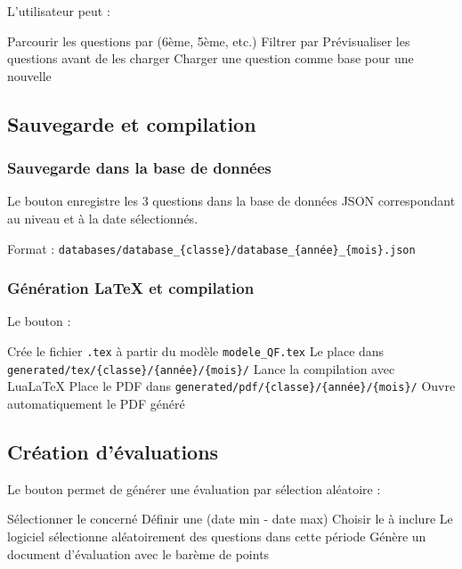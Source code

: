 L'utilisateur peut :
\begin{tcbenumerate}
    \tcbitem Parcourir les questions par  (6ème, 5ème, etc.)
    \tcbitem Filtrer par 
    \tcbitem Prévisualiser les questions avant de les charger
    \tcbitem Charger une question comme base pour une nouvelle
\end{tcbenumerate}

\subsection{Sauvegarde et compilation}

\subsubsection{Sauvegarde dans la base de données}

Le bouton  enregistre les 3 questions dans la base de données JSON correspondant au niveau et à la date sélectionnés.

Format : \texttt{databases/database\_\{classe\}/database\_\{année\}\_\{mois\}.json}

\subsubsection{Génération LaTeX et compilation}

Le bouton  :
\begin{tcbenumerate}
    \tcbitem Crée le fichier \texttt{.tex} à partir du modèle \texttt{modele\_QF.tex}
    \tcbitem Le place dans \texttt{generated/tex/\{classe\}/\{année\}/\{mois\}/}
    \tcbitem Lance la compilation avec LuaLaTeX
    \tcbitem Place le PDF dans \texttt{generated/pdf/\{classe\}/\{année\}/\{mois\}/}
    \tcbitem Ouvre automatiquement le PDF généré
\end{tcbenumerate}

\subsection{Création d'évaluations}

Le bouton  permet de générer une évaluation par sélection aléatoire :

\begin{tcbenumerate}
    \tcbitem Sélectionner le  concerné
    \tcbitem Définir une  (date min - date max)
    \tcbitem Choisir le  à inclure
    \tcbitem Le logiciel sélectionne aléatoirement des questions dans cette période
    \tcbitem Génère un document d'évaluation avec le barème de points
\end{tcbenumerate}

